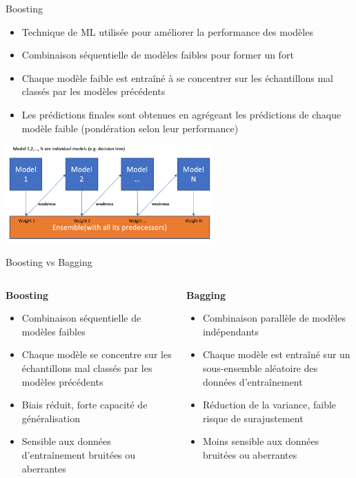 \documentclass{beamer}
\begin{document}
\begin{frame}{Boosting}
	\begin{itemize}
		\item Technique de ML utilisée pour améliorer la performance des modèles
		\item Combinaison \color{blue} séquentielle \color{black}
		de modèles faibles pour former un fort
		\item Chaque modèle faible est entraîné à se concentrer sur les échantillons mal classés par les modèles précédents
		\item Les prédictions finales sont obtenues en agrégeant les prédictions de chaque modèle faible (pondération selon leur performance)
	\end{itemize}
	
	\begin{center}
		\includegraphics[width=0.6\textwidth]{boosting.png}
	\end{center}
\end{frame}



\begin{frame}{Boosting vs Bagging}
	\begin{columns}
		\begin{column}{0.5\textwidth}
			\textbf{Boosting}
			\begin{itemize}
				\item Combinaison séquentielle de modèles faibles
				\item Chaque modèle se concentre sur les échantillons mal classés par les modèles précédents
				\item Biais réduit, forte capacité de généralisation
				\item Sensible aux données d'entraînement bruitées ou aberrantes
			\end{itemize}
		\end{column}
		\begin{column}{0.5\textwidth}
			\textbf{Bagging}
			\begin{itemize}
				\item Combinaison parallèle de modèles indépendants
				\item Chaque modèle est entraîné sur un sous-ensemble aléatoire des données d'entraînement
				\item Réduction de la variance, faible risque de surajustement
				\item Moins sensible aux données bruitées ou aberrantes
			\end{itemize}
		\end{column}
	\end{columns}
\end{frame}
\end{document}

